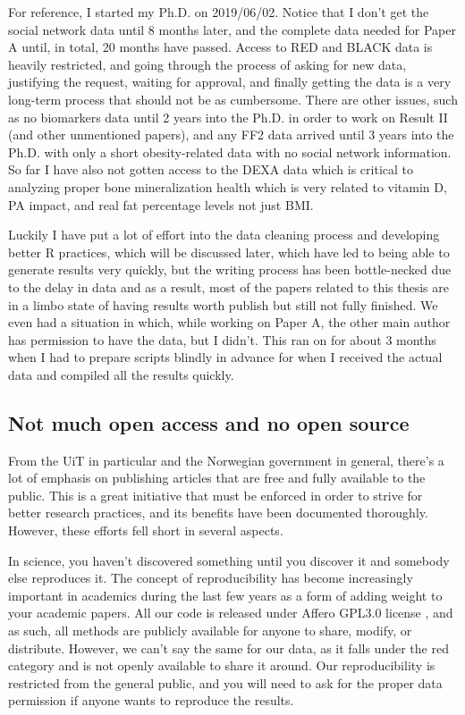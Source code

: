 For reference, I started my Ph.D. on 2019/06/02. Notice that I don't get the social network data until 8 months later, and the complete data needed for Paper A until, in total, 20 months have passed. Access to RED and BLACK data is heavily restricted, and going through the process of asking for new data, justifying the request, waiting for approval, and finally getting the data is a very long-term process that should not be as cumbersome. There are other issues, such as no biomarkers data until 2 years into the Ph.D. in order to work on Result II (and other unmentioned papers), and any FF2 data arrived until 3 years into the Ph.D. with only a short obesity-related data with no social network information. So far I have also not gotten access to the DEXA data which is critical to analyzing proper bone mineralization health which is very related to vitamin D, PA impact, and real fat percentage levels not just BMI.

Luckily I have put a lot of effort into the data cleaning process and developing better R practices, which will be discussed later, which have led to being able to generate results very quickly, but the writing process has been bottle-necked due to the delay in data and as a result, most of the papers related to this thesis are in a limbo state of having results worth publish but still not fully finished. We even had a situation in which, while working on Paper A, the other main author has permission to have the data, but I didn't. This ran on for about 3 months when I had to prepare scripts blindly in advance for when I received the actual data and compiled all the results quickly.


\subsection{Not much open access and no open source}

From the UiT in particular and the Norwegian government in general, there's a lot of emphasis on publishing articles that are free and fully available to the public. This is a great initiative that must be enforced in order to strive for better research practices, and its benefits have been documented thoroughly. However, these efforts fell short in several aspects.

In science, you haven't discovered something until you discover it and somebody else reproduces it. The concept of reproducibility has become increasingly important in academics during the last few years as a form of adding weight to your academic papers. All our code is released under Affero GPL3.0 license \cite{ref:afferoGPL}, and as such, all methods are publicly available for anyone to share, modify, or distribute. However, we can't say the same for our data, as it falls under the red category and is not openly available to share it around. Our reproducibility is restricted from the general public, and you will need to ask for the proper data permission if anyone wants to reproduce the results.

